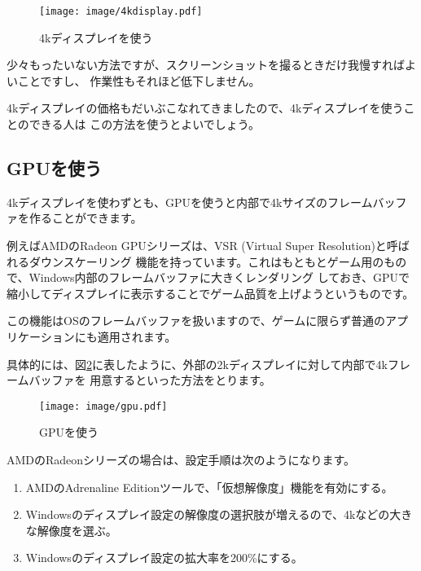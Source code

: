 \begin{figure}[btp]
  \begin{center}
    \texttt{[image: image/4kdisplay.pdf]}
    \caption{4kディスプレイを使う} \label{fig:4k-display}
  \end{center}
\end{figure}

少々もったいない方法ですが、スクリーンショットを撮るときだけ我慢すればよいことですし、
作業性もそれほど低下しません。

4kディスプレイの価格もだいぶこなれてきましたので、4kディスプレイを使うことのできる人は
この方法を使うとよいでしょう。

\subsection{GPUを使う}
4kディスプレイを使わずとも、GPUを使うと内部で4kサイズのフレームバッファを作ることができます。

例えばAMDのRadeon GPUシリーズは、VSR (Virtual Super Resolution)と呼ばれるダウンスケーリング
機能を持っています。これはもともとゲーム用のもので、Windows内部のフレームバッファに大きくレンダリング
しておき、GPUで縮小してディスプレイに表示することでゲーム品質を上げようというものです。

この機能はOSのフレームバッファを扱いますので、ゲームに限らず普通のアプリケーションにも適用されます。

具体的には、図\ref{fig:gpu}に表したように、外部の2kディスプレイに対して内部で4kフレームバッファを
用意するといった方法をとります。

\begin{figure}[btp]
  \begin{center}
    \texttt{[image: image/gpu.pdf]}
    \caption{GPUを使う} \label{fig:gpu}
  \end{center}
\end{figure}

AMDのRadeonシリーズの場合は、設定手順は次のようになります。


\begin{enumerate}
  \item AMDのAdrenaline Editionツールで、「仮想解像度」機能を有効にする。
  \item Windowsのディスプレイ設定の解像度の選択肢が増えるので、4kなどの大きな解像度を選ぶ。
  \item Windowsのディスプレイ設定の拡大率を200\%にする。
\end{enumerate}

